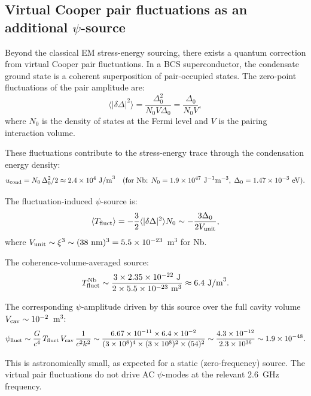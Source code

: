 \documentclass[11pt]{article}
\newcommand{\ee}[1]{\times 10^{#1}}
\begin{document}
\subsection{Virtual Cooper pair fluctuations as an additional $\psi$-source}

Beyond the classical EM stress-energy sourcing, there exists a quantum
correction from virtual Cooper pair fluctuations. In a BCS superconductor,
the condensate ground state is a coherent superposition of pair-occupied
states. The zero-point fluctuations of the pair amplitude are:
\begin{equation}
\langle |\delta\Delta|^2 \rangle = \frac{\Delta_0^2}{N_0 V \Delta_0}
= \frac{\Delta_0}{N_0 V},
\end{equation}
where $N_0$ is the density of states at the Fermi level and $V$ is the
pairing interaction volume.

These fluctuations contribute to the stress-energy trace through the
condensation energy density:
\begin{equation}
u_{\rm cond} = N_0\,\Delta_0^2/2 \approx 2.4\ee{4}~{\rm J/m}^3
\quad (\text{for Nb: } N_0 = 1.9\ee{47}~{\rm J}^{-1}{\rm m}^{-3},\;
\Delta_0 = 1.47\ee{-3}~{\rm eV}).
\end{equation}

The fluctuation-induced $\psi$-source is:
\begin{equation}
\langle T_{\rm fluct} \rangle = -\frac{3}{2}\langle |\delta\Delta|^2 \rangle N_0
\sim -\frac{3\Delta_0}{2V_{\rm unit}},
\end{equation}
where $V_{\rm unit} \sim \xi^3 \sim (38~{\rm nm})^3 = 5.5\ee{-23}$~m$^3$
for Nb.

The coherence-volume-averaged source:
\begin{equation}
T_{\rm fluct}^{\rm Nb} \sim \frac{3 \times 2.35\ee{-22}~{\rm J}}
{2 \times 5.5\ee{-23}~{\rm m}^3} \approx 6.4~{\rm J/m}^3.
\end{equation}

The corresponding $\psi$-amplitude driven by this source over the full cavity
volume $V_{\rm cav} \sim 10^{-2}$~m$^3$:
\begin{equation}
\psi_{\rm fluct} \sim \frac{G}{c^4}\,T_{\rm fluct}\,V_{\rm cav}\,\frac{1}{c^2 k^2}
\sim \frac{6.67\ee{-11} \times 6.4 \times 10^{-2}}{(3\ee{8})^4 \times (3\ee{8})^2 \times (54)^2}
\sim \frac{4.3\ee{-12}}{2.3\ee{36}} \sim 1.9\ee{-48}.
\end{equation}

This is astronomically small, as expected for a static (zero-frequency) source.
The virtual pair fluctuations do not drive AC $\psi$-modes at the relevant
2.6~GHz frequency.
\end{document}
